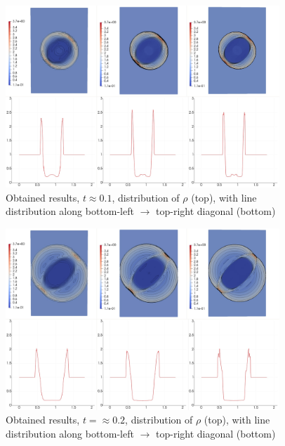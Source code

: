 \begin{figure}[H]
	\begin{center}
		\includegraphics[width=0.92\textwidth]{img/mhd-blast/new/blast,1noadapt1.jpg}
\vspace{-3mm}
	\caption{Obtained results, $t \approx 0.1$, distribution of $\rho$ (top), with line distribution along bottom-left $\rightarrow$ top-right diagonal (bottom)}
	\label{figure:blastNew11}
	\end{center}
\end{figure}
\vspace{-10mm}

\begin{figure}[H]
	\begin{center}
		\includegraphics[width=0.92\textwidth]{img/mhd-blast/new/blast,1noadapt3.jpg}
\vspace{-3mm}
	\caption{Obtained results, $t = \approx 0.2$, distribution of $\rho$ (top), with line distribution along bottom-left $\rightarrow$ top-right diagonal (bottom)}
	\label{figure:blastNew12}
	\end{center}
\end{figure}
\vspace{-10mm}

